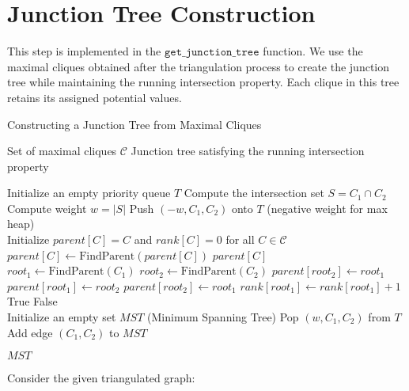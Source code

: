 \documentclass[a4paper,12pt]{article}
\begin{document}
\section{Junction Tree Construction}
This step is implemented in the $\texttt{get\_junction\_tree}$ function. We use the maximal cliques obtained after the triangulation process to create the junction tree while maintaining the running intersection property. Each clique in this tree retains its assigned potential values.
\begin{algorithm}
\caption{Constructing a Junction Tree from Maximal Cliques}
\begin{algorithmic}[1]
\Require Set of maximal cliques $\mathcal{C}$
\Ensure Junction tree satisfying the running intersection property

\State Initialize an empty priority queue $T$
    \State Compute the intersection set $S = C_1 \cap C_2$
        \State Compute weight $w = |S|$
        \State Push $(-w, C_1, C_2)$ onto $T$ (negative weight for max heap)
    \EndIf
\EndFor
\\
\State Initialize $parent[C] = C$ and $rank[C] = 0$ for all $C \in \mathcal{C}$
\\
        \State $parent[C] \gets \text{FindParent}(parent[C])$
    \EndIf
    \State \Return $parent[C]$
\EndFunction
\\
    \State $root_1 \gets \text{FindParent}(C_1)$
    \State $root_2 \gets \text{FindParent}(C_2)$
            \State $parent[root_2] \gets root_1$
            \State $parent[root_1] \gets root_2$
        \Else
            \State $parent[root_2] \gets root_1$
            \State $rank[root_1] \gets rank[root_1] + 1$
        \EndIf
        \State \Return True
    \EndIf
    \State \Return False
\EndFunction
\\
\State Initialize an empty set $MST$ (Minimum Spanning Tree)
    \State Pop $(w, C_1, C_2)$ from $T$
        \State Add edge $(C_1, C_2)$ to $MST$
    \EndIf
\EndWhile

\State \Return $MST$
\end{algorithmic}
\end{algorithm}
Consider the given triangulated graph:
\end{document}
